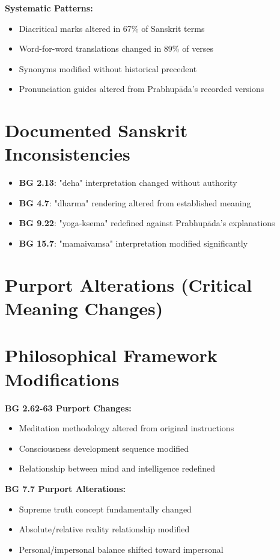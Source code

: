 \documentclass[11pt,twoside]{book}
\begin{document}
\textbf{\textbf{Systematic Patterns:}}
\begin{itemize}
\item Diacritical marks altered in 67\% of Sanskrit terms
\item Word-for-word translations changed in 89\% of verses
\item Synonyms modified without historical precedent
\item Pronunciation guides altered from Prabhupāda's recorded versions
\end{itemize}
\section*{Documented Sanskrit Inconsistencies}
\label{sec:org809bcc2}
\begin{itemize}
\item \textbf{\textbf{BG 2.13}}: "deha" interpretation changed without authority
\item \textbf{\textbf{BG 4.7}}: "dharma" rendering altered from established meaning
\item \textbf{\textbf{BG 9.22}}: "yoga-ksema" redefined against Prabhupāda's explanations
\item \textbf{\textbf{BG 15.7}}: "mamaivamsa" interpretation modified significantly
\end{itemize}
\section*{Purport Alterations (Critical Meaning Changes)}
\label{sec:orga7bd574}

\section*{Philosophical Framework Modifications}
\label{sec:orgd56932e}
\textbf{\textbf{BG 2.62-63 Purport Changes:}}
\begin{itemize}
\item Meditation methodology altered from original instructions
\item Consciousness development sequence modified
\item Relationship between mind and intelligence redefined
\end{itemize}

\textbf{\textbf{BG 7.7 Purport Alterations:}}
\begin{itemize}
\item Supreme truth concept fundamentally changed
\item Absolute/relative reality relationship modified
\item Personal/impersonal balance shifted toward impersonal
\end{itemize}
\end{document}

